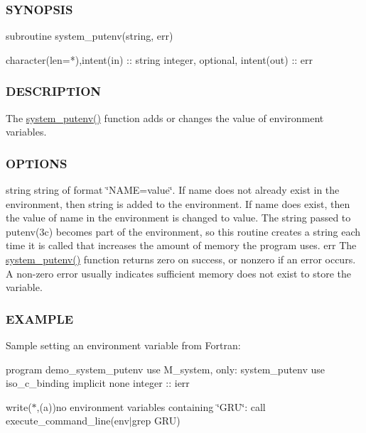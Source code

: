 \subsubsection*{S\+Y\+N\+O\+P\+S\+IS}

\begin{DoxyVerb}subroutine system_putenv(string, err)

 character(len=*),intent(in)    :: string
 integer, optional, intent(out) :: err
\end{DoxyVerb}


\subsubsection*{D\+E\+S\+C\+R\+I\+P\+T\+I\+ON}

The \hyperlink{namespacem__system_af0c9df8e59cac9cd617cd1e20448ea7d}{system\+\_\+putenv()} function adds or changes the value of environment variables.

\subsubsection*{O\+P\+T\+I\+O\+NS}

string string of format \char`\"{}\+N\+A\+M\+E=value\char`\"{}. If name does not already exist in the environment, then string is added to the environment. If name does exist, then the value of name in the environment is changed to value. The string passed to putenv(3c) becomes part of the environment, so this routine creates a string each time it is called that increases the amount of memory the program uses. err The \hyperlink{namespacem__system_af0c9df8e59cac9cd617cd1e20448ea7d}{system\+\_\+putenv()} function returns zero on success, or nonzero if an error occurs. A non-\/zero error usually indicates sufficient memory does not exist to store the variable.

\subsubsection*{E\+X\+A\+M\+P\+LE}

Sample setting an environment variable from Fortran\+:

program demo\+\_\+system\+\_\+putenv use M\+\_\+system, only\+: system\+\_\+putenv use iso\+\_\+c\+\_\+binding implicit none integer \+:\+: ierr

write($\ast$,\textquotesingle{}(a)\textquotesingle{})\textquotesingle{}no environment variables containing \char`\"{}\+G\+R\+U\char`\"{}\+:\textquotesingle{} call execute\+\_\+command\+\_\+line(\textquotesingle{}env$\vert$grep G\+RU\textquotesingle{})


